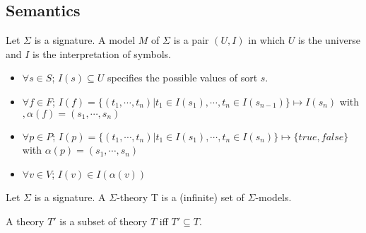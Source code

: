 \subsection{Semantics}

\begin{definition}
Let $\Sigma$ is a signature. A model $M$ of $\Sigma$ is a pair $(U, I)$ in which $U$ is the universe and $I$ is the interpretation of symbols.
\begin{itemize}
\item $\forall s \in S$; $I(s) \subseteq U$ specifies the possible values of sort $s$.
\item $\forall f \in F$; $I(f) = \{(t_1,\cdots, t_n)| t_1 \in I(s_1),\cdots, t_n \in I(s_{n-1})\} \mapsto I(s_n)$ with $, \alpha(f) = (s_1,\cdots, s_n)$
\item $\forall p \in P$; $I(p) = \{(t_1,\cdots, t_n)| t_1 \in I(s_1),\cdots, t_n \in I(s_n)\} \mapsto \{true, false\}$ with $\alpha(p) = (s_1,\cdots, s_n)$
\item $\forall v \in V$; $I(v) \in I(\alpha(v))$
\end{itemize}
\end{definition}

\begin{definition}
Let $\Sigma$ is a signature. A $\Sigma$-theory T is a (infinite) set of $\Sigma$-models.
\end{definition}
A theory $T'$ is a subset of theory $T$ iff $T' \subseteq T$.

